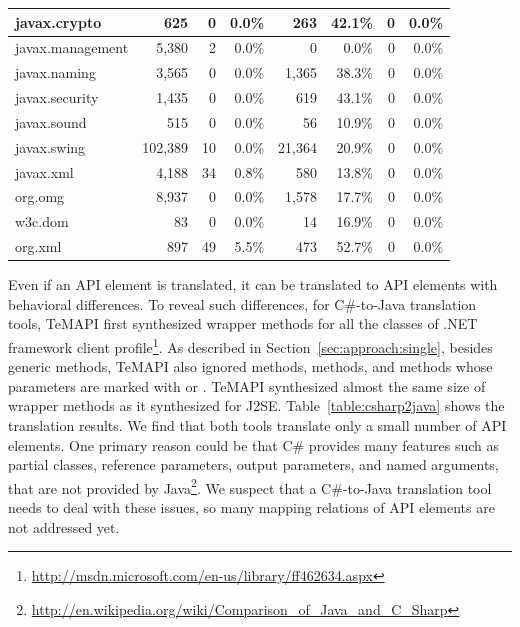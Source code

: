 \begin{table}[t]
\begin{SmallOut}
\begin {tabular} {|l|r|r|r|r|r|r|r|}
\hline
javax.crypto        &  \hfill 625   &  0    &  0.0\%  &  263  &  42.1\%  &  0    & 0.0\%\\
\hline
javax.management   &  \hfill 5,380   & 2    &   0.0\%  & 0     &  0.0\%  & 0    & 0.0\%  \\
\hline
javax.naming       &  \hfill 3,565   & 0    &   0.0\%  & 1,365   &  38.3\%  &  0    & 0.0\%  \\
\hline
javax.security       &  \hfill 1,435  & 0     &  0.0\%  & 619     &  43.1\%  & 0    & 0.0\%\\
\hline
javax.sound          &  \hfill 515   & 0    &  0.0\%  & 56    &  10.9\%  & 0   & 0.0\%  \\
\hline
javax.swing          &  102,389& 10   &  0.0\%  &  21,364 &  20.9\%   &  0   & 0.0\%\\
\hline
javax.xml            &  \hfill 4,188  &  34   &  0.8\% &  580   &  13.8\%  & 0  & 0.0\%\\
\hline
org.omg              &  \hfill 8,937   & 0    &  0.0\%  & 1,578  &  17.7\%  & 0   & 0.0\%  \\
\hline
w3c.dom          &  \hfill 83     & 0    &  0.0\%  & 14     &  16.9\%   & 0   & 0.0\%  \\
\hline
org.xml             &   \hfill 897    & 49   &  5.5\%  & 473    & 52.7\%    & 0   & 0.0\%\\
\hline
\end{tabular}%
 \label{table:package}
\end{SmallOut}%
\end{table}

Even if an API element is translated, it can be translated to API elements with behavioral differences. To reveal such differences, for C\#-to-Java translation tools, TeMAPI first synthesized wrapper methods for all the classes of .NET framework client profile\footnote{\url{http://msdn.microsoft.com/en-us/library/ff462634.aspx}}. As described in Section~\ref{sec:approach:single}, besides generic methods, TeMAPI also ignored  methods,  methods, and methods whose parameters are marked with  or . TeMAPI synthesized almost the same size of wrapper methods as it synthesized for J2SE. Table~\ref{table:csharp2java} shows the translation results. We find that both tools translate only a small number of API elements. One primary reason could be that C\# provides many features such as partial classes, reference parameters, output parameters, and named arguments, that are not provided by Java\footnote{\url{http://en.wikipedia.org/wiki/Comparison_of_Java_and_C_Sharp}}. We suspect that a C\#-to-Java translation tool needs to deal with these issues, so many mapping relations of API elements are not addressed yet.

